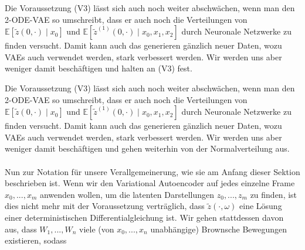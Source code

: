 \documentclass[12pt]{article}
\newcommand{\E}{\mathbb{E}}
\newcommand{\tz}{\widetilde{z}}
\begin{document}
	\newpage
	\noindent
	
	Die Voraussetzung (V3) lässt sich auch noch weiter abschwächen, wenn man den 2-ODE-VAE so umschreibt, dass er auch noch die Verteilungen von $\E[\tz(0,\cdot) \mid x_0]$ und $\E[\tz^{(1)}(0,\cdot) \mid x_0,x_1,x_2]$ durch Neuronale Netzwerke zu finden versucht. Damit kann auch das generieren gänzlich neuer Daten, wozu VAEs auch verwendet werden, stark verbessert werden. Wir werden uns aber weniger damit beschäftigen und halten an (V3) fest.
	
	Die Voraussetzung (V3) lässt sich auch noch weiter abschwächen, wenn man den 2-ODE-VAE so umschreibt, dass er auch noch die Verteilungen von $\E[\tz(0,\cdot) \mid x_0]$ und $\E[\tz^{(1)}(0,\cdot) \mid x_0,x_1,x_2]$ durch Neuronale Netzwerke zu finden versucht. Damit kann auch das generieren gänzlich neuer Daten, wozu VAEs auch verwendet werden, stark verbessert werden. Wir werden uns aber weniger damit beschäftigen und gehen weiterhin von der Normalverteilung aus.\\
	\\
	Nun zur Notation für unsere Verallgemeinerung, wie sie am Anfang dieser Sektion beschrieben ist.
	Wenn wir den Variational Autoencoder auf jedes einzelne Frame $x_0,...,x_m$ anwenden wollen, um die latenten Darstellungen $z_0,...,z_m$ zu finden, ist dies nicht mehr mit der Voraussetzung verträglich, dass $\tz(\cdot,\omega)$ eine Lösung einer deterministischen Differentialgleichung ist. Wir gehen stattdessen davon aus, dass $W_1,...,W_n$ viele (von $x_0,...,x_n$ unabhängige) Brownsche Bewegungen existieren, sodass 
	
	
	\newpage
\end{document}
